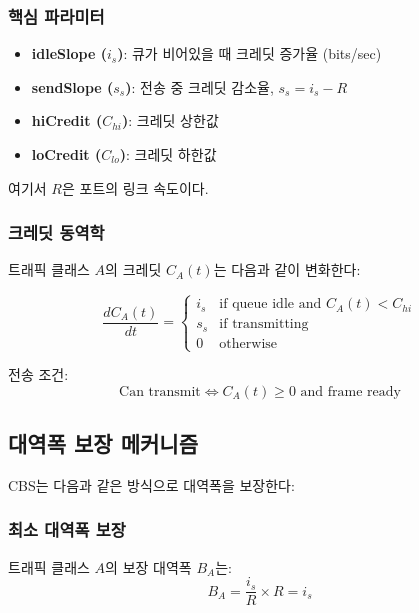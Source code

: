 \documentclass[10pt,twocolumn]{IEEEtran}
\begin{document}
\subsubsection{핵심 파라미터}

\begin{itemize}
\item \textbf{idleSlope ($i_s$)}: 큐가 비어있을 때 크레딧 증가율 (bits/sec)
\item \textbf{sendSlope ($s_s$)}: 전송 중 크레딧 감소율, $s_s = i_s - R$
\item \textbf{hiCredit ($C_{hi}$)}: 크레딧 상한값
\item \textbf{loCredit ($C_{lo}$)}: 크레딧 하한값
\end{itemize}

여기서 $R$은 포트의 링크 속도이다.

\subsubsection{크레딧 동역학}

트래픽 클래스 $A$의 크레딧 $C_A(t)$는 다음과 같이 변화한다:

\begin{equation}
\frac{dC_A(t)}{dt} = \begin{cases}
i_s & \text{if queue idle and } C_A(t) < C_{hi} \\
s_s & \text{if transmitting} \\
0 & \text{otherwise}
\end{cases}
\end{equation}

전송 조건:
\begin{equation}
\text{Can transmit} \iff C_A(t) \geq 0 \text{ and frame ready}
\end{equation}

\subsection{대역폭 보장 메커니즘}

CBS는 다음과 같은 방식으로 대역폭을 보장한다:

\subsubsection{최소 대역폭 보장}
트래픽 클래스 $A$의 보장 대역폭 $B_A$는:
\begin{equation}
B_A = \frac{i_s}{R} \times R = i_s
\end{equation}
\end{document}
